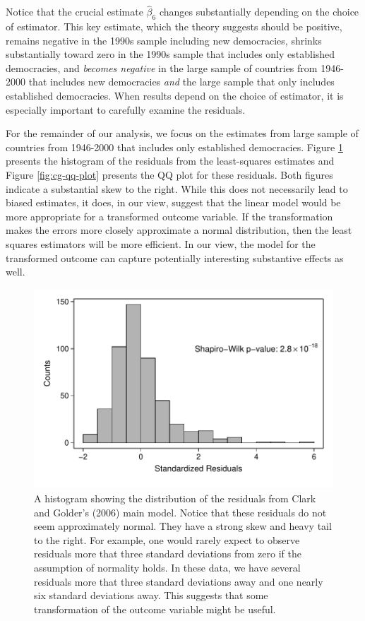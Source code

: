 \documentclass[12pt]{article}
\begin{document}
Notice that the crucial estimate $\hat{\beta}_6$ changes substantially depending on the choice of estimator. This key estimate, which the theory suggests should be positive, remains negative in the 1990s sample including new democracies, shrinks substantially toward zero in the 1990s sample that includes only established democracies, and \textit{becomes negative} in the large sample of countries from 1946-2000 that includes new democracies \textit{and} the large sample that only includes established democracies. When results depend on the choice of estimator, it is especially important to carefully examine the residuals.

For the remainder of our analysis, we focus on the estimates from large sample of countries from 1946-2000 that includes only established democracies. Figure \ref{fig:cg-residuals-hist} presents the histogram of the residuals from the least-squares estimates and Figure \ref{fig:cg-qq-plot} presents the QQ plot for these residuals. Both figures indicate a substantial skew to the right. While this does not necessarily lead to biased estimates, it does, in our view, suggest that the linear model would be more appropriate for a transformed outcome variable. If the transformation makes the errors more closely approximate a normal distribution, then the least squares estimators will be more efficient. In our view, the model for the transformed outcome can capture potentially interesting substantive effects as well.

\begin{figure}[h!]
\begin{center}
\includegraphics[scale = 0.6]{figs/cg-residuals-hist.pdf}
\caption{A histogram showing the distribution of the residuals from Clark and Golder's (2006) main model. Notice that these residuals do not seem approximately normal. They have a strong skew and heavy tail to the right. For example, one would rarely expect to observe residuals more that three standard deviations from zero if the assumption of normality holds. In these data, we have several residuals more that three standard deviations away and one nearly six standard deviations away. This suggests that some transformation of the outcome variable might be useful.}\label{fig:cg-residuals-hist}	
\end{center}
\end{figure}
\end{document}
